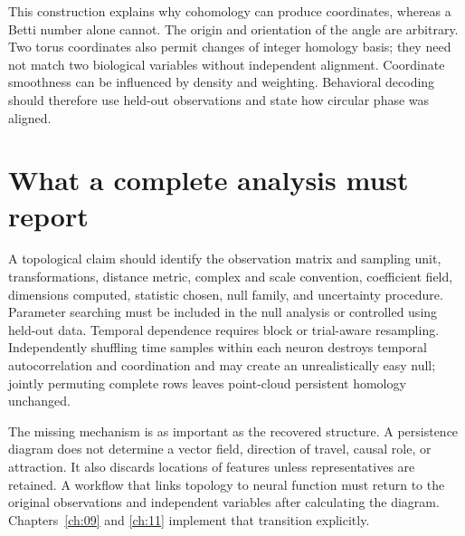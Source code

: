 This construction explains why cohomology can produce coordinates, whereas a Betti number alone cannot. The origin and orientation of the angle are arbitrary. Two torus coordinates also permit changes of integer homology basis; they need not match two biological variables without independent alignment. Coordinate smoothness can be influenced by density and weighting. Behavioral decoding should therefore use held-out observations and state how circular phase was aligned.

\section{What a complete analysis must report}
A topological claim should identify the observation matrix and sampling unit, transformations, distance metric, complex and scale convention, coefficient field, dimensions computed, statistic chosen, null family, and uncertainty procedure. Parameter searching must be included in the null analysis or controlled using held-out data. Temporal dependence requires block or trial-aware resampling. Independently shuffling time samples within each neuron destroys temporal autocorrelation and coordination and may create an unrealistically easy null; jointly permuting complete rows leaves point-cloud persistent homology unchanged.

The missing mechanism is as important as the recovered structure. A persistence diagram does not determine a vector field, direction of travel, causal role, or attraction. It also discards locations of features unless representatives are retained. A workflow that links topology to neural function must return to the original observations and independent variables after calculating the diagram. Chapters~\ref{ch:09} and \ref{ch:11} implement that transition explicitly.

